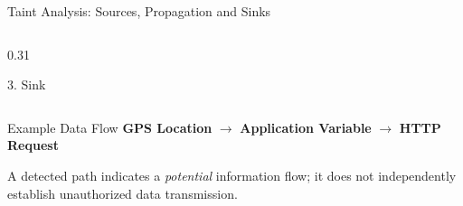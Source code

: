 \documentclass[aspectratio=169,10pt]{beamer}
\begin{document}
\begin{frame}{Taint Analysis: Sources, Propagation and Sinks}
\begin{columns}[T]
\begin{column}{0.31\textwidth}
\begin{block}{3. Sink}
\end{block}

\end{column}

\end{columns}

\vspace{5pt}

\begin{alertblock}{Example Data Flow}
\centering
\textbf{GPS Location}
$\longrightarrow$
\textbf{Application Variable}
$\longrightarrow$
\textbf{HTTP Request}
\end{alertblock}

A detected path indicates a \emph{potential} information flow; it does not independently establish unauthorized data transmission.

\end{frame}

\end{document}
